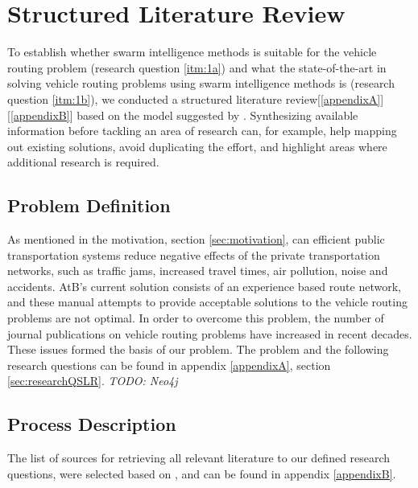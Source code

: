 \section{Structured Literature Review}
To establish whether swarm intelligence methods is suitable for the vehicle routing problem (research question \ref{itm:1a}) and what the state-of-the-art in solving vehicle routing problems using swarm intelligence methods is (research question \ref{itm:1b}), we conducted a structured literature review[\ref{appendixA}][\ref{appendixB}] based on the model suggested by \citet{kofod2014}. Synthesizing available information before tackling an area of research can, for example, help mapping out existing solutions, avoid duplicating the effort, and highlight areas where additional research is required\citep{kofod2014}. 

\subsection{Problem Definition}
As mentioned in the motivation, section \vref{sec:motivation}, can efficient public transportation systems reduce negative effects of the private transportation networks, such as traffic jams, increased travel times, air pollution, noise and accidents. AtB's current solution consists of an experience based route network, and these manual attempts to provide acceptable solutions to the vehicle routing problems are not optimal. In order to overcome this problem, the number of journal publications on vehicle routing problems have increased in recent decades. These issues formed the basis of our problem. The problem and the following research questions can be found in appendix \ref{appendixA}, section \vref{sec:researchQSLR}. 
\emph{\color{red} TODO: Neo4j}

\subsection{Process Description}
The list of sources for retrieving all relevant literature to our defined research questions, were selected based on \citep[p.3]{kofod2014}, and can be found in appendix \vref{appendixB}. 

